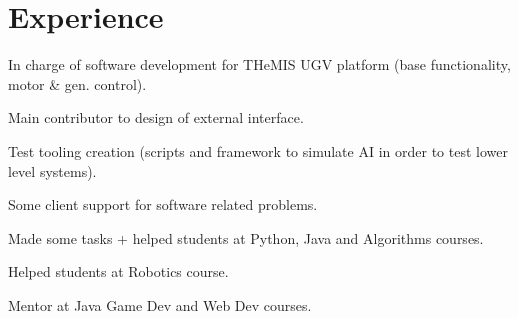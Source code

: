 \documentclass[letterpaper]{deedy-resume} %
\begin{document}
\begin{minipage}[t]{0.66\textwidth} %


\section{Experience}


\vspace{\topsep} %
\begin{tightitemize}
  \item In charge of software development for THeMIS UGV platform (base functionality, motor \& gen. control).
  \item Main contributor to design of external interface.
  \item Test tooling creation (scripts and framework to simulate AI in order to test lower level systems).
  \item Some client support for software related problems.
\end{tightitemize}

\sectionspace %



\begin{tightitemize}
\item Made some tasks + helped students at Python, Java and Algorithms courses.
\item Helped students at Robotics course.
\item Mentor at Java Game Dev and Web Dev courses.
\end{tightitemize}

\sectionspace %




\end{minipage}
\end{document}
